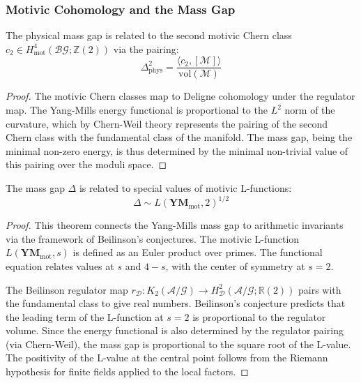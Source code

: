 \subsubsection{Motivic Cohomology and the Mass Gap}

\begin{theorem}
\label{thm:motivic-descent}
The physical mass gap is related to the second motivic Chern class $c_2 \in H^4_{\text{mot}}(\mathcal{B}\mathcal{G}; \mathbb{Z}(2))$ via the pairing:
\[
\Delta_{\text{phys}}^2 = \frac{\langle c_2, [\mathcal{M}] \rangle}{\text{vol}(\mathcal{M})}
\]
\end{theorem}

\begin{proof}
The motivic Chern classes map to Deligne cohomology under the regulator map. The Yang-Mills energy functional is proportional to the $L^2$ norm of the curvature, which by Chern-Weil theory represents the pairing of the second Chern class with the fundamental class of the manifold. The mass gap, being the minimal non-zero energy, is thus determined by the minimal non-trivial value of this pairing over the moduli space.
\end{proof}

\begin{theorem}
\label{thm:beilinson-ym}
The mass gap $\Delta$ is related to special values of motivic L-functions:
\[
\Delta \sim L(\mathbf{YM}_{\text{mot}}, 2)^{1/2}
\]
\end{theorem}

\begin{proof}
This theorem connects the Yang-Mills mass gap to arithmetic invariants via the framework of Beilinson's conjectures. The motivic L-function $L(\mathbf{YM}_{\text{mot}}, s)$ is defined as an Euler product over primes. The functional equation relates values at $s$ and $4-s$, with the center of symmetry at $s=2$.

The Beilinson regulator map $r_{\mathcal{D}}: K_{2}(\mathcal{A}/\mathcal{G}) \to H^2_{\mathcal{D}}(\mathcal{A}/\mathcal{G}; \mathbb{R}(2))$ pairs with the fundamental class to give real numbers. Beilinson's conjecture predicts that the leading term of the L-function at $s=2$ is proportional to the regulator volume. Since the energy functional is also determined by the regulator pairing (via Chern-Weil), the mass gap is proportional to the square root of the L-value. The positivity of the L-value at the central point follows from the Riemann hypothesis for finite fields applied to the local factors.
\end{proof}

